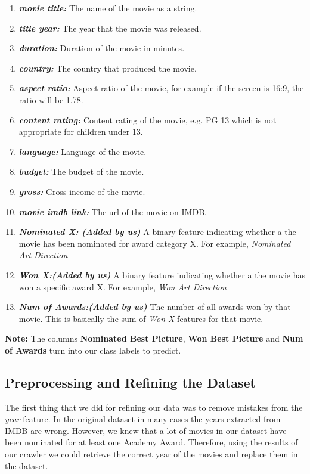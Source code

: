 \documentclass[journal,transmag]{IEEEtran}
\begin{document}
\begin{enumerate}
\item{\textbf{\textit{movie title:}}} The name of the movie as a string.
\item{\textbf{\textit{title year:}}} The year that the movie was released.
\item{\textbf{\textit{duration:}}} Duration of the movie in minutes.
\item{\textbf{\textit{country:}}} The country that produced the movie.
\item{\textbf{\textit{aspect ratio:}}} Aspect ratio of the movie, for example if the screen is 16:9, the ratio will be 1.78.
\item{\textbf{\textit{content rating:}}} Content rating of the movie, e.g. PG 13 which is not appropriate for children under 13.
\item{\textbf{\textit{language:}}} Language of the movie.
\item{\textbf{\textit{budget:}}} The budget of the movie.
\item{\textbf{\textit{gross:}}} Gross income of the movie.
\item{\textbf{\textit{movie imdb link:}}} The url of the movie on IMDB.
\item{\textbf{\textit{Nominated X: (Added by us)}}} A binary feature indicating whether a the movie has been nominated for award category X. For example, \textit{Nominated Art Direction}
\item{\textbf{\textit{Won X:(Added by us)}}} A binary feature indicating whether a the movie has won a specific award X. For example, \textit{Won Art Direction}
\item{\textbf{\textit{Num of Awards:(Added by us)}}} The number of all awards won by that movie. This is basically the sum of \textit{Won X} features for that movie.
\end{enumerate}

\textbf{Note:} The columns \textbf{Nominated Best Picture}, \textbf{Won Best Picture} and \textbf{Num of Awards} turn into our class labels to predict.

\subsection{Preprocessing and Refining the Dataset}
The first thing that we did for refining our data was to remove mistakes from the \textit{year} feature. In the original dataset in many cases the years extracted from IMDB are wrong. However, we knew that a lot of movies in our dataset have been nominated for at least one Academy Award. Therefore, using the results of our crawler we could retrieve the correct year of the movies and replace them in the dataset.\\
\end{document}
